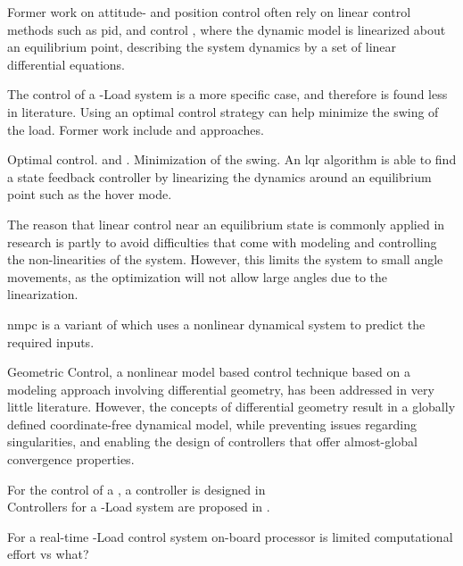 Former work on  attitude- and position control often rely on linear control methods such as \acs{pid}\cite{bibid}, \cite{Bangura2014} and  control \cite{bibid}, where the dynamic model is linearized about an equilibrium point, describing the system dynamics by a set of linear differential equations. 

The control of a -Load system is a more specific case, and therefore is found less in literature. 
Using an optimal control strategy can help minimize the swing of the load. Former work include \cite{PraveenThesis} and \cite{bibid} approaches. 


Optimal control.  and . Minimization of the swing.
An \acf{lqr} algorithm is able to find a state feedback controller by linearizing the dynamics around an equilibrium point such as the hover mode.

The reason that linear control near an equilibrium state is commonly applied in research is partly to avoid difficulties that come with modeling and controlling the non-linearities of the system. However, this limits the system to small angle movements, as the optimization will not allow large angles due to the linearization.
 
\acs{nmpc} is a variant of  which uses a nonlinear dynamical system to predict the required inputs.

Geometric Control, a nonlinear model based control technique based on a modeling approach involving differential geometry, has been addressed in very little literature. However, the concepts of differential geometry result in a globally defined coordinate-free dynamical model, while preventing issues regarding singularities, and enabling the design of controllers that offer almost-global convergence properties.

For the control of a , a  controller is designed in \cite{Goodarzi2013a}\\

Controllers for a -Load system are proposed in \cite{Sreenath2013b,Tang2015}.

For a real-time -Load control system
on-board processor is limited 
computational effort vs what?

